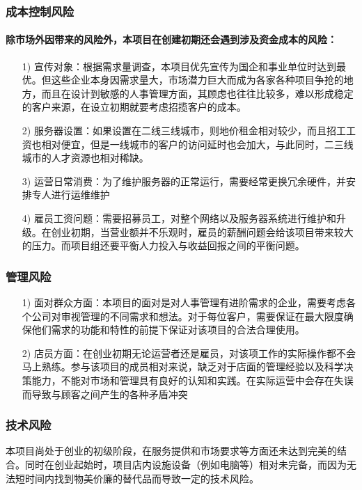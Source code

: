 \documentclass[master]{hduthesis}
\begin{document}
\subsubsection{成本控制风险}
\paragraph{除市场外因带来的风险外，本项目在创建初期还会遇到涉及资金成本的风险：}
\begin{itemize}

	\item[1)]宣传对象：根据需求量调查，本项目优先宣传为国企和事业单位时达到最优。但这些企业本身因需求量大，市场潜力巨大而成为各家各种项目争抢的地方，而且在设计到敏感的人事管理方面，其顾虑也往往比较多，难以形成稳定的客户来源，在设立初期就要考虑招揽客户的成本。


	\item[2)]服务器设置：如果设置在二线三线城市，则地价租金相对较少，而且招工工资也相对便宜，但是一线城市的客户的访问延时也会加大，与此同时，二三线城市的人才资源也相对稀缺。


	\item[3)]运营日常消费：为了维护服务器的正常运行，需要经常更换冗余硬件，并安排专人进行运维维护


	\item[4)]雇员工资问题：需要招募员工，对整个网络以及服务器系统进行维护和升级。在创业初期，当营业额并不乐观时，雇员的薪酬问题会给该项目带来较大的压力。而项目组还要平衡人力投入与收益回报之间的平衡问题。
\end{itemize}
\subsubsection{管理风险}
\begin{itemize}
	\item[1)]面对群众方面：本项目的面对是对人事管理有进阶需求的企业，需要考虑各个公司对审视管理的不同需求和想法。对于每位客户，需要保证在最大限度确保他们需求的功能和特性的前提下保证对该项目的合法合理使用。

	\item[2)]店员方面：在创业初期无论运营者还是雇员，对该项工作的实际操作都不会马上熟练。参与该项目的成员相对来说，缺乏对于店面的管理经验以及科学决策能力，不能对市场和管理具有良好的认知和实践。在实际运营中会存在失误而导致与顾客之间产生的各种矛盾冲突
\end{itemize}
\subsubsection{技术风险}
本项目尚处于创业的初级阶段，在服务提供和市场要求等方面还未达到完美的结合。同时在创业起始时，项目店内设施设备（例如电脑等）相对未完备，而因为无法短时间内找到物美价廉的替代品而导致一定的技术风险。
\end{document}

